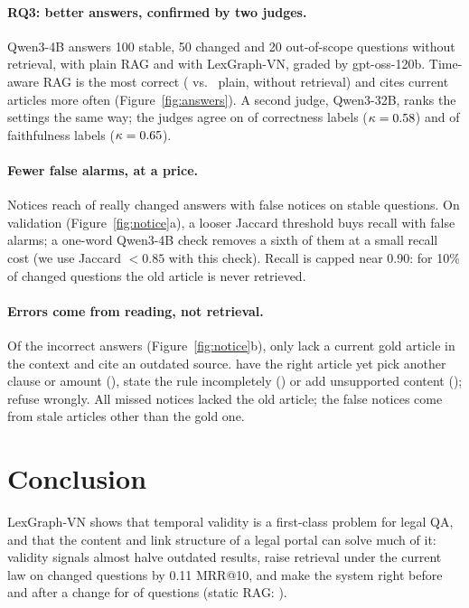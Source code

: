 \documentclass{article} %
\begin{document}
\paragraph{RQ3: better answers, confirmed by two judges.}
Qwen3-4B answers 100 stable, 50 changed and 20 out-of-scope questions without retrieval, with plain RAG and with
LexGraph-VN, graded by gpt-oss-120b. Time-aware RAG is the most correct (\ResAnsCorrect{} vs.\ \ResAnsPlainCorrect{}
plain, \ResAnsNoneCorrectPct{} without retrieval) and cites current articles more often (Figure~\ref{fig:answers}). A
second judge, Qwen3-32B, ranks the settings the same way; the judges agree on \JTwoAgreeCorrect{} of correctness labels
($\kappa = 0.58$) and \JTwoAgreeFaithful{} of faithfulness labels ($\kappa = 0.65$).


\paragraph{Fewer false alarms, at a price.}
Notices reach \ResAnsNoticeRecallPct{} of really changed answers with \ResAnsFalseAlarmPct{} false notices on stable
questions. On validation (Figure~\ref{fig:notice}a), a looser Jaccard threshold buys recall with false alarms; a one-word
Qwen3-4B check removes a sixth of them at a small recall cost (we use Jaccard $<0.85$ with this check). Recall is capped
near 0.90: for 10\% of changed questions the old article is never retrieved.

\paragraph{Errors come from reading, not retrieval.}
Of the \FmWrong{} incorrect answers (Figure~\ref{fig:notice}b), only \FmRetrieval{} lack a current gold article in the
context and \FmOutdated{} cite an outdated source. \FmMisread{} have the right article yet pick another clause or amount
(\FmClause), state the rule incompletely (\FmIncomplete) or add unsupported content (\FmUnsupported); \FmRefusal{}
refuse wrongly. All \FmMissedNoFact{} missed notices lacked the old article; the \FmFalse{} false notices come from
stale articles other than the gold one.

\section{Conclusion}
\label{sec:conclusion}
LexGraph-VN shows that temporal validity is a first-class problem for legal QA, and that the content and link
structure of a legal portal can solve much of it: validity signals almost halve outdated results, raise retrieval under
the current law on changed questions by 0.11 MRR@10, and make the system right before and after a change for
\ResTtBothPct{} of questions (static RAG: \ResTtStaticBothPct).
\end{document}

